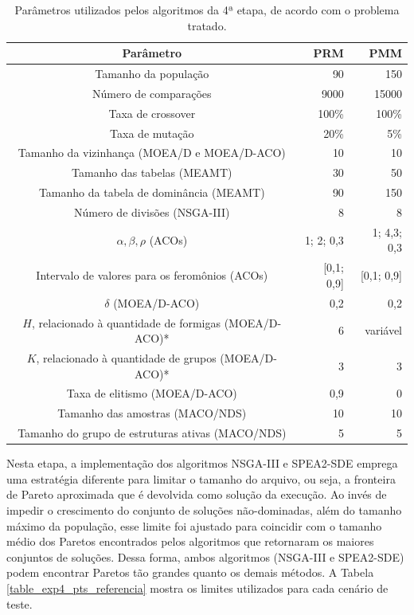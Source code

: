 \begin{table}[!htbp]
	\caption{Parâmetros utilizados pelos algoritmos da 4ª etapa, de acordo com o problema tratado.}
	\label{table_exp4_params}
	\begin{center}
		\begin{tabular}{c|r|r}
			\textbf{Parâmetro} & \textbf{PRM} &  \textbf{PMM} \\ %
			\hline
			Tamanho da população               &    90 &      150 \\ %
			Número de comparações        &   9000 &      15000 \\ %
			Taxa de crossover                & 100\% &    100\% \\ %
			Taxa de mutação                 &  20\% &      5\% \\ %
			Tamanho da vizinhança (MOEA/D e MOEA/D-ACO)    &    10 &       10 \\ %
			Tamanho das tabelas (MEAMT)   &    30 &       50 \\ %
			Tamanho da tabela de dominância (MEAMT) &    90 &      150 \\ %
			Número de divisões (NSGA-III)&     8 &        8 \\ %
			$\alpha, \beta, \rho$ (ACOs)& 1; 2; 0,3 & 1; 4,3; 0,3 \\ %
			Intervalo de valores para os feromônios (ACOs)& [0,1; 0,9] & [0,1; 0,9] \\ %
			$\delta$ (MOEA/D-ACO)& 0,2 & 0,2 \\ %
			$H$, relacionado à quantidade de formigas (MOEA/D-ACO)*& 6 & variável \\ %
			$K$, relacionado à quantidade de grupos (MOEA/D-ACO)*& 3 & 3 \\ %
			Taxa de elitismo (MOEA/D-ACO)& 0,9 & 0 \\ %
			Tamanho das amostras (MACO/NDS)& 10 & 10 \\  %
			Tamanho do grupo de estruturas ativas (MACO/NDS)& 5 & 5 \\
			\hline
		\end{tabular}
	\end{center}
\end{table}

Nesta etapa, a implementação dos algoritmos NSGA-III e SPEA2-SDE emprega uma estratégia diferente para limitar o tamanho do arquivo, ou seja, a fronteira de Pareto aproximada que é devolvida como solução da execução. Ao invés de impedir o crescimento do conjunto de soluções não-dominadas, além do tamanho máximo da população, esse limite foi ajustado para coincidir com o tamanho médio dos Paretos encontrados pelos algoritmos que retornaram os maiores conjuntos de soluções. Dessa forma, ambos algoritmos (NSGA-III e SPEA2-SDE) podem encontrar Paretos tão grandes quanto os demais métodos. A Tabela \ref{table_exp4_pts_referencia} mostra os limites utilizados para cada cenário de teste.

